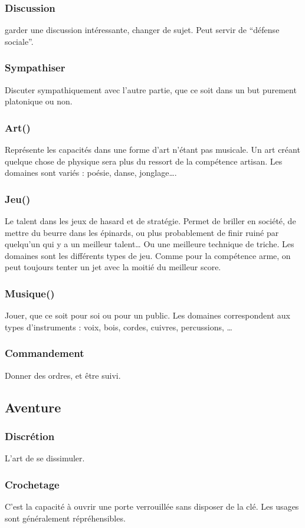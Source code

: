\documentclass[10pt,a4paper,twocolumn]{book}
\begin{document}
\subsubsection{Discussion}
garder une discussion intéressante, changer de sujet. Peut servir de “défense sociale”.
\subsubsection{Sympathiser}
Discuter sympathiquement avec l’autre partie, que ce soit dans un but purement platonique ou non.
\subsubsection{Art()}
Représente les capacités dans une forme d’art n’étant pas musicale. Un art créant quelque chose de physique sera plus du ressort de la compétence artisan. Les domaines sont variés : poésie, danse, jonglage….
\subsubsection{Jeu()}
Le talent dans les jeux de hasard et de stratégie. Permet de briller en société, de mettre du beurre dans les épinards, ou plus probablement de finir ruiné par quelqu’un qui y a un meilleur talent… Ou une meilleure technique de triche. Les domaines sont les différents types de jeu. Comme pour la compétence arme, on peut toujours tenter un jet avec la moitié du meilleur score.
\subsubsection{Musique()}
Jouer, que ce soit pour soi ou pour un public. Les domaines correspondent aux types d’instruments : voix, bois, cordes, cuivres, percussions, …
\subsubsection{Commandement}
Donner des ordres, et être suivi.
\subsection{Aventure}
\subsubsection{Discrétion}
L’art de se dissimuler.
\subsubsection{Crochetage }
C’est la capacité à ouvrir une porte verrouillée sans disposer de la clé. Les usages sont généralement répréhensibles.
\end{document}
